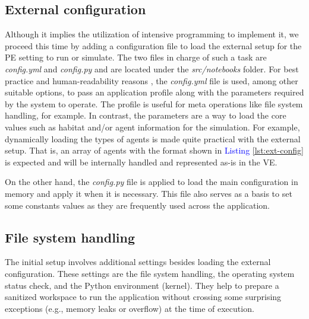 \subsection{External configuration}
Although it implies the utilization of intensive programming to implement it, we proceed this time by adding a configuration file to load the external setup for the PE setting to run or simulate. The two files in charge of such a task are \emph{config.yml} and \emph{config.py} and are located under the \emph{src/notebooks} folder. For best practice and human-readability reasons \cite{mthoma2014cfgyml}, the \emph{config.yml} file is used, among other suitable options, to pass an application profile along with the parameters required by the system to operate. The profile is useful for meta operations like file system handling, for example. In contrast, the parameters are a way to load the core values such as habitat and/or agent information for the simulation. For example, dynamically loading the types of agents is made quite practical with the external setup. That is, an array of agents with the format shown in \textcolor{blue}{Listing} \ref{lst:ext-config} is expected and will be internally handled and represented as-is in the VE.

On the other hand, the \emph{config.py} file is applied to load the main configuration in memory and apply it when it is necessary. This file also serves as a basis to set some constants values as they are frequently used across the application.

\subsection{File system handling}
The initial setup involves additional settings besides loading the external configuration. These settings are the file system handling, the operating system status check, and the Python environment (kernel). They help to prepare a sanitized workspace to run the application without crossing some surprising exceptions (e.g., memory leaks or overflow) at the time of execution.

